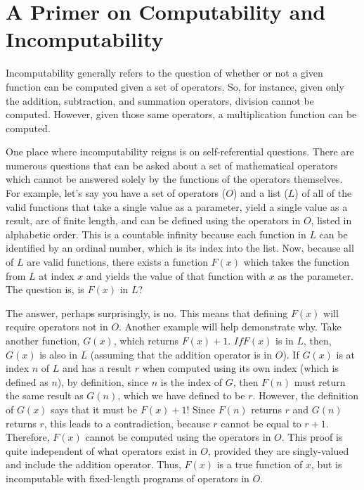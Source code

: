 \section[A Primer on Computability]{A Primer on Computability and Incomputability}

Incomputability generally refers to the question of whether or not a given function can be computed given a set of operators.  So, for instance, given only the addition, subtraction, and summation operators, division cannot be computed.  However, given those same operators, a multiplication function can be computed.  

One place where incomputability reigns is on self-referential questions.  There are numerous questions that can be asked about a set of mathematical operators which cannot be answered solely by the functions of the operators themselves.  For example, let's say you have a set of operators ($O$) and a list ($L$) of all of the valid functions that take a single value as a parameter, yield a single value as a result, are of finite length, and can be defined using the operators in $O$, listed in alphabetic order.  This is a countable infinity because each function in $L$ can be identified by an ordinal number, which is its index into the list.  Now, because all of $L$ are valid functions, there exists a function $F(x)$ which takes the function from $L$ at index $x$ and yields the value of that function with $x$ as the parameter.  The question is, is $F(x)$ in $L$?  

The answer, perhaps surprisingly, is no.  This means that defining $F(x)$ will require operators not in $O$.  Another example will help demonstrate why. Take another function, $G(x)$, which returns $F(x) + 1$.  $If F(x)$ is in $L$, then, $G(x)$ is also in $L$ (assuming that the addition operator is in $O$).  If $G(x)$ is at index $n$ of $L$ and has a result $r$ when computed using its own index (which is defined as $n$), by definition, since $n$ is the index of $G$, then $F(n)$ must return the same result as $G(n)$, which we have defined to be $r$.  However, the definition of $G(x)$ says that it must be $F(x) + 1$!  Since $F(n)$ returns $r$ and $G(n)$ returns $r$, this leads to a contradiction, because $r$ cannot be equal to $r + 1$.  Therefore, $F(x)$ cannot be computed using the operators in $O$.  This proof is quite independent of what operators exist in $O$, provided they are singly-valued and include the addition operator.  Thus, $F(x)$ is a true function of $x$, but is incomputable with fixed-length programs of operators in $O$.

